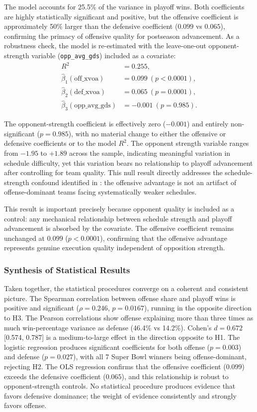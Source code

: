 The model accounts for 25.5\% of the variance in playoff wins. Both
coefficients are highly statistically significant and positive, but the
offensive coefficient is approximately 50\% larger than the defensive
coefficient ($0.099$ vs $0.065$), confirming the primacy of offensive quality
for postseason advancement. As a robustness check, the model is re-estimated
with the leave-one-out opponent-strength variable (\texttt{opp\_avg\_gds})
included as a covariate:
\begin{align*}
  R^2 &= 0.255, \\
  \hat{\beta}_1(\text{off\_xvoa}) &= 0.099 \ (p < 0.0001), \\
  \hat{\beta}_2(\text{def\_xvoa}) &= 0.065 \ (p = 0.0001), \\
  \hat{\beta}_3(\text{opp\_avg\_gds}) &= -0.001 \ (p = 0.985).
\end{align*}

The opponent-strength coefficient is effectively zero ($-0.001$) and entirely
non-significant ($p = 0.985$), with no material change to either the offensive
or defensive coefficients or to the model $R^2$. The opponent strength variable
ranges from $-1.95$ to $+1.89$ across the sample, indicating meaningful
variation in schedule difficulty, yet this variation bears no relationship to
playoff advancement after controlling for team quality. This null result
directly addresses the schedule-strength confound identified in
: the offensive advantage is not an artifact of
offense-dominant teams facing systematically weaker schedules.

This result is important precisely because opponent quality is included as a
control: any mechanical relationship between schedule strength and playoff
advancement is absorbed by the covariate. The offensive \xvoa{} coefficient
remains unchanged at $0.099$ ($p < 0.0001$), confirming that the offensive
advantage represents genuine execution quality independent of opposition
strength.

\subsubsection{Synthesis of Statistical Results}

Taken together, the statistical procedures converge on a coherent and
consistent picture. The Spearman correlation between offense share and playoff
wins is positive and significant ($\rho = 0.246$, $p = 0.0167$), running in the
opposite direction to H3. The Pearson correlations show offense explaining
more than three times as much win-percentage variance as defense (46.4\% vs
14.2\%). Cohen's $d = 0.672$ [0.574, 0.787] is a medium-to-large effect in the direction opposite to H1.
The logistic regression produces significant coefficients for both offense
($p = 0.003$) and defense ($p = 0.027$), with all 7 Super Bowl winners being
offense-dominant, rejecting H2. The OLS regression confirms that the offensive
coefficient ($0.099$) exceeds the defensive coefficient ($0.065$), and this
relationship is robust to opponent-strength controls. No statistical procedure
produces evidence that favors defensive dominance; the weight of evidence
consistently and strongly favors offense.

